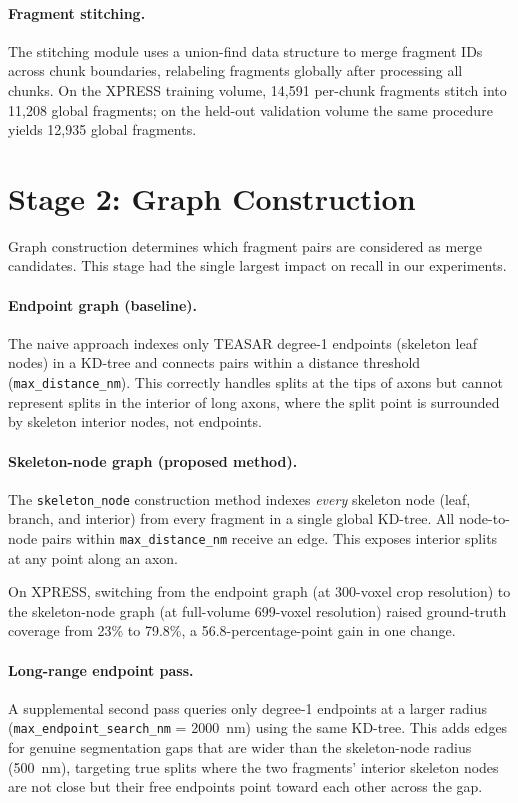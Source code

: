 \paragraph{Fragment stitching.}
The stitching module uses a union-find data structure to merge fragment IDs
across chunk boundaries, relabeling fragments globally after processing all
chunks. On the XPRESS training volume, 14{,}591 per-chunk fragments stitch
into 11{,}208 global fragments; on the held-out validation volume the same
procedure yields 12{,}935 global fragments.

\section{Stage 2: Graph Construction}

Graph construction determines which fragment pairs are considered as merge
candidates. This stage had the single largest impact on recall in our
experiments.

\paragraph{Endpoint graph (baseline).}
The naive approach indexes only TEASAR degree-1 endpoints (skeleton leaf nodes)
in a KD-tree and connects pairs within a distance threshold
(\texttt{max\_distance\_nm}). This correctly handles splits at the tips of axons
but cannot represent splits in the interior of long axons, where the split point
is surrounded by skeleton interior nodes, not endpoints.

\paragraph{Skeleton-node graph (proposed method).}
The \texttt{skeleton\_node} construction method indexes \emph{every} skeleton
node (leaf, branch, and interior) from every fragment in a single global
KD-tree. All node-to-node pairs within \texttt{max\_distance\_nm} receive an
edge. This exposes interior splits at any point along an axon.

On XPRESS, switching from the endpoint graph (at 300-voxel crop resolution) to
the skeleton-node graph (at full-volume 699-voxel resolution) raised
ground-truth coverage from 23\% to 79.8\%, a 56.8-percentage-point gain in one
change.

\paragraph{Long-range endpoint pass.}
A supplemental second pass queries only degree-1 endpoints at a larger radius
(\texttt{max\_endpoint\_search\_nm} = 2000~nm) using the same KD-tree.
This adds edges for genuine segmentation gaps that are wider than the skeleton-node
radius (500~nm), targeting true splits where the two fragments' interior skeleton
nodes are not close but their free endpoints point toward each other across the gap.


